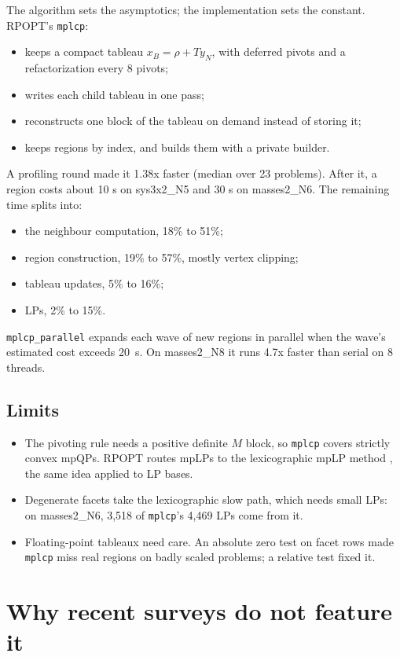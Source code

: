 \documentclass[11pt]{article}
\newcommand{\code}[1]{\texttt{#1}}
\let\oldsection\section
\renewcommand{\section}{\Needspace{8\baselineskip}\oldsection}
\let\oldsubsection\subsection
\renewcommand{\subsection}{\Needspace{7\baselineskip}\oldsubsection}
\begin{document}
The algorithm sets the asymptotics; the implementation sets the constant. RPOPT's \code{mplcp}:
\begin{itemize}
  \item keeps a compact tableau $x_B = \rho + T y_N$, with deferred pivots and a refactorization every 8 pivots;
  \item writes each child tableau in one pass;
  \item reconstructs one block of the tableau on demand instead of storing it;
  \item keeps regions by index, and builds them with a private builder.
\end{itemize}
A profiling round made it 1.38x faster (median over 23 problems). After it, a region costs about 10 \textmu s on
sys3x2\_N5 and 30 \textmu s on masses2\_N6. The remaining time splits into:
\begin{itemize}
  \item the neighbour computation, 18\% to 51\%;
  \item region construction, 19\% to 57\%, mostly vertex clipping;
  \item tableau updates, 5\% to 16\%;
  \item LPs, 2\% to 15\%.
\end{itemize}
\code{mplcp\_parallel} expands each wave of new regions in parallel when the wave's estimated cost exceeds
20~\textmu s. On masses2\_N8 it runs 4.7x faster than serial on 8 threads.

\subsection{Limits}

\begin{itemize}
  \item The pivoting rule needs a positive definite $M$ block, so \code{mplcp} covers strictly convex mpQPs.
  RPOPT routes mpLPs to the lexicographic mpLP method \cite{jones2007}, the same idea applied to LP bases.
  \item Degenerate facets take the lexicographic slow path, which needs small LPs: on masses2\_N6, 3,518 of
  \code{mplcp}'s 4,469 LPs come from it.
  \item Floating-point tableaux need care. An absolute zero test on facet rows made \code{mplcp} miss real regions
  on badly scaled problems; a relative test fixed it.
\end{itemize}

\section{Why recent surveys do not feature it}
\end{document}
